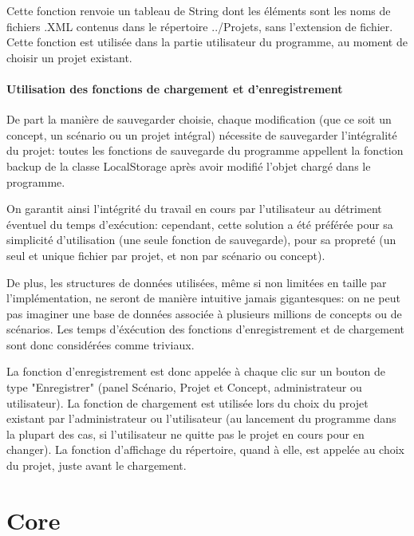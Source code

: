 \documentclass[12pt]{report}
\begin{document}
Cette fonction renvoie un tableau de String dont les éléments sont les noms de fichiers .XML contenus dans le répertoire ../Projets, sans l'extension
de fichier. Cette fonction est utilisée dans la partie utilisateur du programme, au moment de choisir un projet existant.


	\paragraph{Utilisation des fonctions de chargement et d'enregistrement}

De part la manière de sauvegarder choisie, chaque modification (que ce soit un concept, un scénario ou un projet intégral) nécessite de sauvegarder
l'intégralité du projet: toutes les fonctions de sauvegarde du programme appellent la fonction backup de la classe LocalStorage après avoir modifié
l'objet chargé dans le programme.

On garantit ainsi l'intégrité du travail en cours par l'utilisateur au détriment éventuel du temps d'exécution: cependant, cette solution a été
préférée pour sa simplicité d'utilisation (une seule fonction de sauvegarde), pour sa propreté (un seul et unique fichier par projet, et non par scénario ou concept).

De plus, les structures de données utilisées, même si non limitées en taille par l'implémentation, ne seront de manière intuitive jamais gigantesques:
on ne peut pas imaginer une base de données associée à plusieurs millions de concepts ou de scénarios. Les temps d'éxécution des fonctions d'enregistrement
et de chargement sont donc considérées comme triviaux.

La fonction d'enregistrement est donc appelée à chaque clic sur un bouton de type "Enregistrer" (panel Scénario, Projet et Concept, administrateur ou utilisateur).
La fonction de chargement est utilisée lors du choix du projet existant par l'administrateur ou l'utilisateur (au lancement du programme dans la plupart des cas,
si l'utilisateur ne quitte pas le projet en cours pour en changer).
La fonction d'affichage du répertoire, quand à elle, est appelée au choix du projet, juste avant le chargement.


\section{Core}
\end{document}
